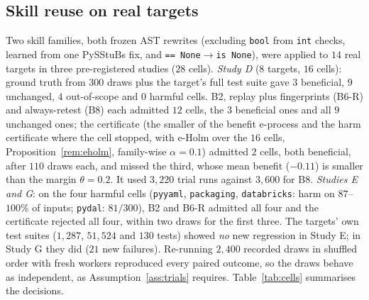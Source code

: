 \subsection{Skill reuse on real targets}
\label{sec:eval-skills}
Two skill families, both frozen AST rewrites (excluding \texttt{bool} from \texttt{int} checks, learned from one PySStuBs fix, and
\texttt{== None}$\to$\texttt{is None}),
were applied to $14$ real targets in three pre-registered studies ($28$ cells).
\emph{Study D} ($8$ targets, $16$ cells): ground truth from $300$ draws plus the target's full test suite gave $3$ beneficial,
$9$ unchanged, $4$ out-of-scope and $0$ harmful cells.  B2, replay plus fingerprints (B6-R) and always-retest (B8) each admitted
$12$ cells, the $3$ beneficial ones and all $9$ unchanged ones; the certificate (the smaller of the benefit e-process and the harm certificate where the cell stopped, with e-Holm over the
$16$ cells, Proposition~\ref{rem:eholm}, family-wise $\alpha=0.1$) admitted $2$ cells, both
beneficial, after $110$ draws each, and missed the third, whose mean benefit ($-0.11$) is smaller than the margin $\theta=0.2$.  It used $3{,}220$ trial runs
against $3{,}600$ for B8.
\emph{Studies E and G}: on the four harmful cells (\texttt{pyyaml}, \texttt{packaging}, \texttt{databricks}: harm on $87$--$100\%$ of
inputs; \texttt{pydal}: $81/300$), B2 and B6-R admitted all four and the certificate rejected all four, within two draws for the first
three.  The targets' own test suites ($1{,}287$, $51{,}524$ and $130$ tests) showed \emph{no} new regression in Study E; in Study G
they did ($21$ new failures).
Re-running $2{,}400$ recorded draws in shuffled order with fresh workers reproduced every paired outcome, so the draws behave as
independent, as Assumption~\ref{ass:trials} requires.
Table~\ref{tab:cells} summarises the decisions.

